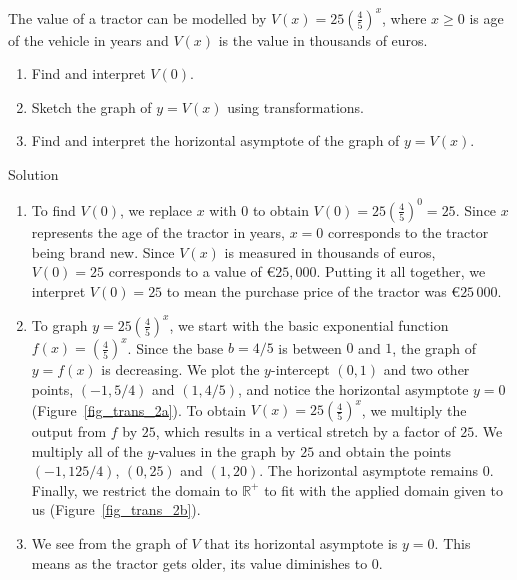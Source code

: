 \begin{example}  \label{cardepreciationex} The value of a tractor can be modelled by $V(x) = 25\left(\frac{4}{5}\right)^{x}$, where $x \geq 0$ is age of the vehicle in years and $V(x)$ is the value in thousands of euros. 

\begin{enumerate}

\item  Find and interpret $V(0)$.

\item  Sketch the graph of $y=V(x)$ using transformations.

\item  Find and interpret the horizontal asymptote of the graph of $y=V(x)$.

\end{enumerate}

Solution 

\begin{enumerate}

\item  To find $V(0)$, we replace $x$ with $0$ to obtain $V(0) = 25\left(\frac{4}{5}\right)^{0} = 25$.  Since $x$ represents the age of the tractor in years, $x=0$ corresponds to the tractor being brand new.  Since $V(x)$ is measured in thousands of euros, $V(0)=25$ corresponds to a value of \euro $ 25,000$.  Putting it all together, we interpret $V(0)=25$ to mean the purchase price of the tractor was \euro $25\,000$.


\item  To graph $y=25\left(\frac{4}{5}\right)^{x}$,  we start with the basic exponential function $f(x)=\left(\frac{4}{5}\right)^{x}$.  Since the base $b = 4/5$ is between $0$ and $1$, the graph of $y=f(x)$ is decreasing.  We plot the $y$-intercept $(0,1)$ and two other points, $\left(-1, 5/4\right)$ and $\left(1, 4/5\right)$, and notice the horizontal asymptote $y=0$ (Figure~\ref{fig_trans_2a}).  To obtain $V(x) = 25\left(\frac{4}{5}\right)^{x}$, we multiply the output from $f$ by $25$, which results in a vertical stretch by a factor of $25$.  We multiply all of the $y$-values in the graph by $25$ and obtain the points $\left(-1,125/4\right)$, $(0,25)$ and $(1,20)$. The horizontal asymptote remains 0. Finally, we restrict the domain to $\mathbb{R}^+$  to fit with the applied domain given to us (Figure~\ref{fig_trans_2b}).


\item  We see from the graph of $V$ that its horizontal asymptote is $y=0$. This means as the tractor gets older, its value diminishes to $0$. 
 

\end{enumerate}
\end{example}
